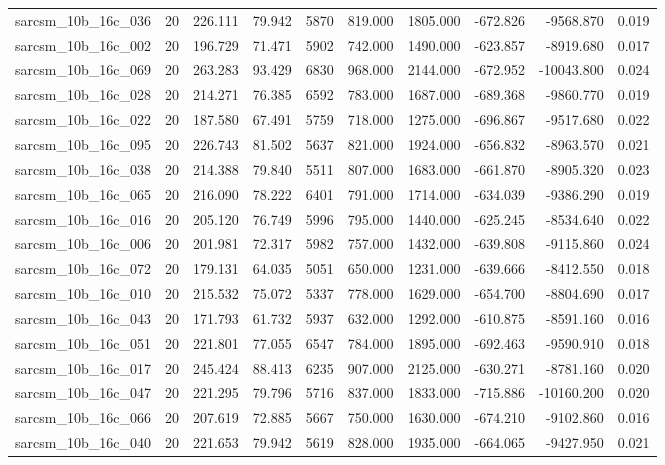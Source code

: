 \begin{tabular}{lrrrrrrrrr}
sarcsm\_10b\_16c\_036 & 20 & 226.111 & 79.942 & 5870 & 819.000 & 1805.000 & -672.826 & -9568.870 & 0.019 \\
sarcsm\_10b\_16c\_002 & 20 & 196.729 & 71.471 & 5902 & 742.000 & 1490.000 & -623.857 & -8919.680 & 0.017 \\
sarcsm\_10b\_16c\_069 & 20 & 263.283 & 93.429 & 6830 & 968.000 & 2144.000 & -672.952 & -10043.800 & 0.024 \\
sarcsm\_10b\_16c\_028 & 20 & 214.271 & 76.385 & 6592 & 783.000 & 1687.000 & -689.368 & -9860.770 & 0.019 \\
sarcsm\_10b\_16c\_022 & 20 & 187.580 & 67.491 & 5759 & 718.000 & 1275.000 & -696.867 & -9517.680 & 0.022 \\
sarcsm\_10b\_16c\_095 & 20 & 226.743 & 81.502 & 5637 & 821.000 & 1924.000 & -656.832 & -8963.570 & 0.021 \\
sarcsm\_10b\_16c\_038 & 20 & 214.388 & 79.840 & 5511 & 807.000 & 1683.000 & -661.870 & -8905.320 & 0.023 \\
sarcsm\_10b\_16c\_065 & 20 & 216.090 & 78.222 & 6401 & 791.000 & 1714.000 & -634.039 & -9386.290 & 0.019 \\
sarcsm\_10b\_16c\_016 & 20 & 205.120 & 76.749 & 5996 & 795.000 & 1440.000 & -625.245 & -8534.640 & 0.022 \\
sarcsm\_10b\_16c\_006 & 20 & 201.981 & 72.317 & 5982 & 757.000 & 1432.000 & -639.808 & -9115.860 & 0.024 \\
sarcsm\_10b\_16c\_072 & 20 & 179.131 & 64.035 & 5051 & 650.000 & 1231.000 & -639.666 & -8412.550 & 0.018 \\
sarcsm\_10b\_16c\_010 & 20 & 215.532 & 75.072 & 5337 & 778.000 & 1629.000 & -654.700 & -8804.690 & 0.017 \\
sarcsm\_10b\_16c\_043 & 20 & 171.793 & 61.732 & 5937 & 632.000 & 1292.000 & -610.875 & -8591.160 & 0.016 \\
sarcsm\_10b\_16c\_051 & 20 & 221.801 & 77.055 & 6547 & 784.000 & 1895.000 & -692.463 & -9590.910 & 0.018 \\
sarcsm\_10b\_16c\_017 & 20 & 245.424 & 88.413 & 6235 & 907.000 & 2125.000 & -630.271 & -8781.160 & 0.020 \\
sarcsm\_10b\_16c\_047 & 20 & 221.295 & 79.796 & 5716 & 837.000 & 1833.000 & -715.886 & -10160.200 & 0.020 \\
sarcsm\_10b\_16c\_066 & 20 & 207.619 & 72.885 & 5667 & 750.000 & 1630.000 & -674.210 & -9102.860 & 0.016 \\
sarcsm\_10b\_16c\_040 & 20 & 221.653 & 79.942 & 5619 & 828.000 & 1935.000 & -664.065 & -9427.950 & 0.021 \\

\end{tabular}
